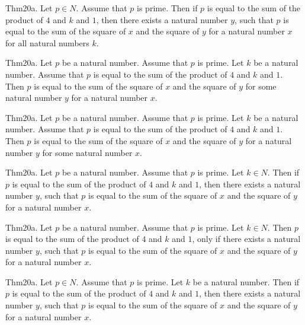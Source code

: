 \documentclass{article}
\begin{document}
Thm20a. Let $p \in N$. Assume that $p$ is prime. Then if $p$ is equal to the sum of the product of $4$ and $k$ and $1$, then there exists a natural number $y$, such that $p$ is equal to the sum of the square of $x$ and the square of $y$ for a natural number $x$ for all natural numbers $k$.

Thm20a. Let $p$ be a natural number. Assume that $p$ is prime. Let $k$ be a natural number. Assume that $p$ is equal to the sum of the product of $4$ and $k$ and $1$. Then $p$ is equal to the sum of the square of $x$ and the square of $y$ for some natural number $y$ for a natural number $x$.

Thm20a. Let $p$ be a natural number. Assume that $p$ is prime. Let $k$ be a natural number. Assume that $p$ is equal to the sum of the product of $4$ and $k$ and $1$. Then $p$ is equal to the sum of the square of $x$ and the square of $y$ for a natural number $y$ for some natural number $x$.

Thm20a. Let $p$ be a natural number. Assume that $p$ is prime. Let $k \in N$. Then if $p$ is equal to the sum of the product of $4$ and $k$ and $1$, then there exists a natural number $y$, such that $p$ is equal to the sum of the square of $x$ and the square of $y$ for a natural number $x$.

Thm20a. Let $p$ be a natural number. Assume that $p$ is prime. Let $k \in N$. Then $p$ is equal to the sum of the product of $4$ and $k$ and $1$, only if there exists a natural number $y$, such that $p$ is equal to the sum of the square of $x$ and the square of $y$ for a natural number $x$.

Thm20a. Let $p \in N$. Assume that $p$ is prime. Let $k$ be a natural number. Then if $p$ is equal to the sum of the product of $4$ and $k$ and $1$, then there exists a natural number $y$, such that $p$ is equal to the sum of the square of $x$ and the square of $y$ for a natural number $x$.
\end{document}
